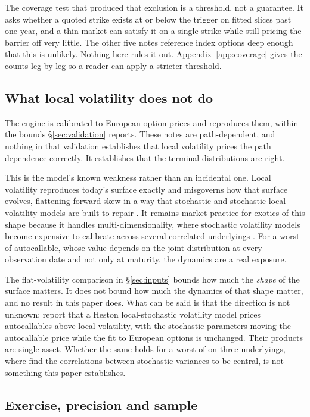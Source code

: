 The coverage test that produced that exclusion is a threshold, not a guarantee.
It asks whether a quoted strike exists at or below the trigger on fitted slices
past one year, and a thin market can satisfy it on a single strike while still
pricing the barrier off very little. The other five notes reference index
options deep enough that this is unlikely. Nothing here rules it out.
Appendix~\ref{app:coverage} gives the counts leg by leg so a reader can apply a
stricter threshold.

\subsection{What local volatility does not do}

The engine is calibrated to European option prices and reproduces them, within
the bounds \S\ref{sec:validation} reports. These notes are path-dependent, and
nothing in that validation establishes that local volatility prices the path
dependence correctly. It establishes that the terminal distributions are
right.

This is the model's known weakness rather than an incidental one. Local
volatility reproduces today's surface exactly and misgoverns how that surface
evolves, flattening forward skew in a way that stochastic and stochastic-local
volatility models are built to repair \citep{Qu2016}. It remains market
practice for exotics of this shape because it handles multi-dimensionality,
where stochastic volatility models become expensive to calibrate across several
correlated underlyings \citep{Grzelak2019}. For a worst-of autocallable, whose
value depends on the joint distribution at every observation date and not only
at maturity, the dynamics are a real exposure.

The flat-volatility comparison in \S\ref{sec:inputs} bounds how much the
\emph{shape} of the surface matters. It does not bound how much the dynamics of
that shape matter, and no result in this paper does. What can be said is that
the direction is not unknown: \citet{Farkas2022} report that a Heston
local-stochastic volatility model prices autocallables above local volatility,
with the stochastic parameters moving the autocallable price while the fit to
European options is unchanged. Their products are single-asset. Whether the
same holds for a worst-of on three underlyings, where \citet{DeCol2017} find
the correlations between stochastic variances to be central, is not something
this paper establishes.

\subsection{Exercise, precision and sample}

